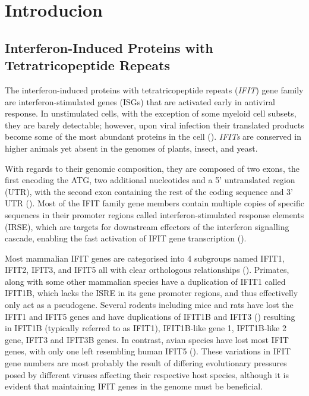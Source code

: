 \chapter{Introducion} \label{ch:Introduction}
\section{Interferon-Induced Proteins with Tetratricopeptide Repeats} \label{sec:Interferon-Induced Proteins with Tetratricopeptide Repeats}
The interferon-induced proteins with tetratricopeptide repeats (\textit{IFIT}) gene family are interferon-stimulated genes (ISGs) that are activated early in antiviral response. In unstimulated cells, with the exception of some myeloid cell subsets, they are barely detectable; however, upon viral infection their translated products become some of the most abundant proteins in the cell (\cite{Diamond2013TheProteins}). \textit{IFITs} are conserved in higher animals yet absent in the genomes of plants, insect, and yeast. 

With regards to their genomic composition, they are composed of two exons, the first encoding the ATG, two additional nucleotides and a 5' untranslated region (UTR), with the second exon containing the rest of the coding sequence and 3' UTR (\cite{deVeer1998IFI60/ISG60/IFIT4Genes}). Most of the IFIT family gene members contain multiple copies of specific sequences in their promoter regions called interferon-stimulated response elements (IRSE), which are targets for downstream effectors of the interferon signalling cascade, enabling the fast activation of IFIT gene transcription (\cite{Lou2009Ifr-9/stat2Stat1}).   

Most mammalian IFIT genes are categorised into 4 subgroups named IFIT1, IFIT2, IFIT3, and IFIT5 all with clear orthologous relationships (\cite{Sarkar2004NovelGenes}). Primates, along with some other mammalian species have a duplication of IFIT1 called IFIT1B, which lacks the ISRE in its gene promoter regions, and thus effectivelly only act as a pseudogene. Several rodents including mice and rats have lost the IFIT1 and IFIT5 genes and have duplications of IFIT1B and IFIT3 (\cite{Daugherty2016Evolution-guidedMammals.}) resulting in IFIT1B (typically referred to as IFIT1), IFIT1B-like gene 1, IFIT1B-like 2 gene, IFIT3 and IFIT3B genes. In contrast, avian species have lost most IFIT genes, with only one left resembling human IFIT5 (\cite{Liu2013Lineage-SpecificFamily}). These variations in IFIT gene numbers are most probably the result of differing evolutionary pressures posed by different viruses affecting their respective host species, although it is evident that maintaining IFIT genes in the genome must be beneficial. 




